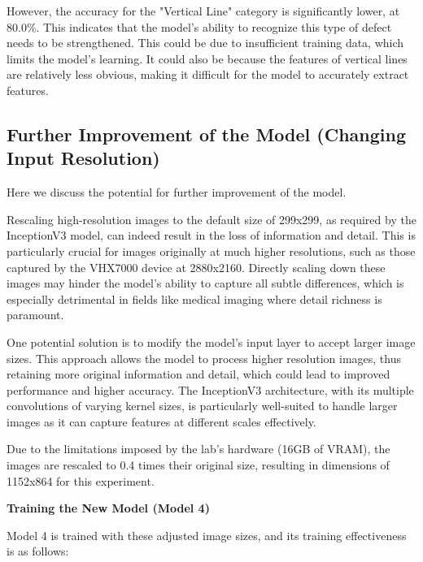 However, the accuracy for the "Vertical Line" category is significantly lower, at 80.0\%. This indicates that the model's ability to recognize this type of defect needs to be strengthened. This could be due to insufficient training data, which limits the model's learning. It could also be because the features of vertical lines are relatively less obvious, making it difficult for the model to accurately extract features.

\subsection{Further Improvement of the Model (Changing Input Resolution)}

Here we discuss the potential for further improvement of the model.

Rescaling high-resolution images to the default size of 299x299, as required by the InceptionV3 model, can indeed result in the loss of information and detail. This is particularly crucial for images originally at much higher resolutions, such as those captured by the VHX7000 device at 2880x2160. Directly scaling down these images may hinder the model's ability to capture all subtle differences, which is especially detrimental in fields like medical imaging where detail richness is paramount.

One potential solution is to modify the model's input layer to accept larger image sizes. This approach allows the model to process higher resolution images, thus retaining more original information and detail, which could lead to improved performance and higher accuracy. The InceptionV3 architecture, with its multiple convolutions of varying kernel sizes, is particularly well-suited to handle larger images as it can capture features at different scales effectively.

Due to the limitations imposed by the lab's hardware (16GB of VRAM), the images are rescaled to 0.4 times their original size, resulting in dimensions of 1152x864 for this experiment.

\textbf{Training the New Model (Model 4)}

Model 4 is trained with these adjusted image sizes, and its training effectiveness is as follows:

